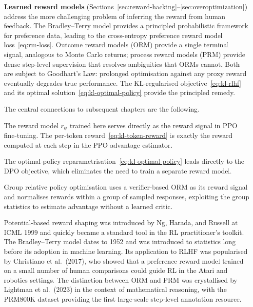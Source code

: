 \textbf{Learned reward models} (Sections~\ref{sec:reward-hacking}--\ref{sec:overoptimization}) address the more challenging problem of inferring the reward from human feedback. The Bradley--Terry model provides a principled probabilistic framework for preference data, leading to the cross-entropy preference reward model loss~\eqref{eq:rm-loss}. Outcome reward models (ORM) provide a single terminal signal, analogous to Monte Carlo returns; process reward models (PRM) provide dense step-level supervision that resolves ambiguities that ORMs cannot. Both are subject to Goodhart's Law: prolonged optimisation against any proxy reward eventually degrades true performance. The KL-regularised objective~\eqref{eq:kl-rlhf} and its optimal solution~\eqref{eq:kl-optimal-policy} provide the principled remedy.

The central connections to subsequent chapters are the following.

\begin{description}[leftmargin=!,labelwidth=3.5cm]
  \item[Chapter~\ref{ch:practical-rlhf} (PPO)] The reward model $r_\psi$ trained here serves directly as the reward signal in PPO fine-tuning. The per-token reward~\eqref{eq:kl-token-reward} is exactly the reward computed at each step in the PPO advantage estimator.
  \item[Chapter~\ref{ch:practical-rlhf} (DPO)] The optimal-policy reparametrisation~\eqref{eq:kl-optimal-policy} leads directly to the DPO objective, which eliminates the need to train a separate reward model.
  \item[Chapter~\ref{ch:practical-rlhf} (GRPO)] Group relative policy optimisation uses a verifier-based ORM as its reward signal and normalises rewards within a group of sampled responses, exploiting the group statistics to estimate advantage without a learned critic.
\end{description}

\begin{remark}
\label{rem:history}
Potential-based reward shaping was introduced by Ng, Harada, and Russell at ICML 1999 and quickly became a standard tool in the RL practitioner's toolkit. The Bradley--Terry model dates to 1952 and was introduced to statistics long before its adoption in machine learning. Its application to RLHF was popularised by Christiano et al.\ (2017), who showed that a preference reward model trained on a small number of human comparisons could guide RL in the Atari and robotics settings. The distinction between ORM and PRM was crystallised by Lightman et al.\ (2023) in the context of mathematical reasoning, with the PRM800K dataset providing the first large-scale step-level annotation resource.
\end{remark}

